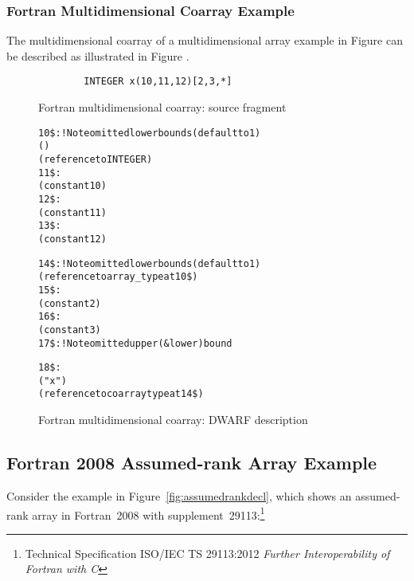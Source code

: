 \subsubsection{Fortran Multidimensional Coarray Example}
The  multidimensional coarray of a multidimensional array example
in Figure  can be described as 
illustrated in Figure .

\begin{figure}[ht]
\begin{lstlisting}
        INTEGER x(10,11,12)[2,3,*]
\end{lstlisting}
\caption{Fortran multidimensional coarray: source fragment}
\label{fig:Fortranmultidimensionalcoarraysourcefragment}
\end{figure}

\begin{figure}[ht]
\begin{dwflisting}
\begin{alltt}

10\$:  \DWTAGarraytype                ! Note omitted lower bounds (default to 1)
          \DWATordering(\DWORDcolmajor)
          \DWATtype(reference to INTEGER)
11\$:      \DWTAGsubrangetype
              \DWATupperbound(constant 10)
12\$:      \DWTAGsubrangetype
              \DWATupperbound(constant 11)
13\$:      \DWTAGsubrangetype
              \DWATupperbound(constant 12)

14\$:  \DWTAGcoarraytype              ! Note omitted lower bounds (default to 1)
          \DWATtype(reference to array_type at 10\$)
15\$:      \DWTAGsubrangetype
              \DWATupperbound(constant 2)
16\$:      \DWTAGsubrangetype
              \DWATupperbound(constant 3)
17\$:      \DWTAGsubrangetype         ! Note omitted upper (\& lower) bound

18\$:  \DWTAGvariable
          \DWATname("x")
          \DWATtype(reference to coarray type at 14\$)
        
\end{alltt}
\end{dwflisting}
\caption{Fortran multidimensional coarray: DWARF description}
\label{fig:FortranmultidimensionalcoarrayDWARFdescription}
\end{figure}


\clearpage
\subsection{Fortran 2008 Assumed-rank Array Example}
\label{app:assumedrankexample}
Consider the example in Figure~\ref{fig:assumedrankdecl}, which shows
an assumed-rank array in Fortran~2008 with
supplement~29113:\footnote{Technical Specification ISO/IEC TS
  29113:2012 \emph{Further Interoperability of Fortran with C}}

